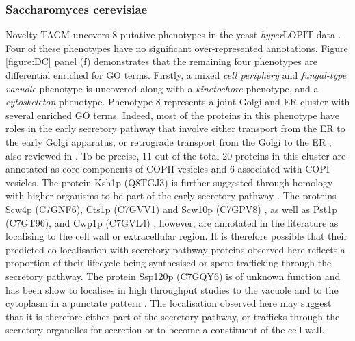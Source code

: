 \documentclass[12pt,english]{article}
\begin{document}
 \subsubsection{Saccharomyces cerevisiae}
Novelty TAGM uncovers $8$ putative phenotypes in the yeast \textit{hyper}LOPIT data \citep{Nightingale::2019}. Four of these phenotypes have no significant over-represented annotations.
Figure \ref{figure:DC} panel (f) demonstrates that the remaining four phenotypes are differential enriched for GO terms. Firstly, a mixed \textit{cell periphery} and \textit{fungal-type vacuole} phenotype is uncovered along with a \textit{kinetochore} phenotype, and a \textit{cytoskeleton} phenotype. Phenotype $8$ represents a joint Golgi and ER cluster with several enriched GO terms.  Indeed, most of the proteins in this phenotype have roles in the early secretory pathway that involve either transport from the ER to the early Golgi apparatus, or retrograde transport from the Golgi to the ER \citep{Bue:2006,Inadome:2005, Otte:2001, Yofe:2016}, also reviewed in \citep{Delic:2013}.
To be precise, $11$ out of the total $20$ proteins in this cluster are annotated as core components of COPII vesicles and $6$ associated with COPI vesicles. The protein Ksh1p (Q8TGJ3) is further suggested through homology with higher organisms to be part of the early secretory pathway \citep{Wendler:2010}. The proteins Scw4p (C7GNF6), Cts1p (C7GVV1) and Scw10p (C7GPV8) \citep{Cappellaro:1998}, as well as Pst1p (C7GT96)\citep{Pardo:2004}, and Cwp1p (C7GVL4) \citep{Yin:2005}, however, are annotated in the literature as localising to the cell wall or extracellular region. It is therefore possible that their predicted co-localisation with secretory pathway proteins observed here reflects a proportion of their lifecycle being synthesised or spent trafficking through the secretory pathway. The protein Ssp120p (C7GQY6) is of unknown function and has been show to localises in high throughput studies to the vacuole \citep{Yofe:2016} and to the cytoplasm in a punctate pattern \citep{Huh:2003}. The localisation observed here may suggest that it is therefore either part of the secretory pathway, or trafficks through the secretory organelles for secretion or to become a constituent of the cell wall. 
\end{document}
